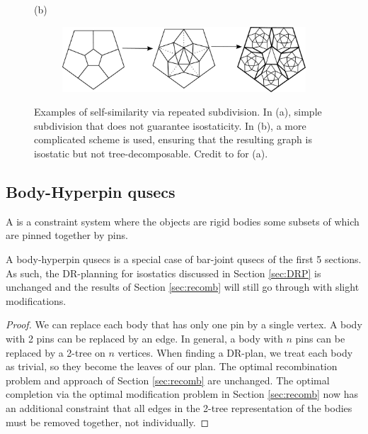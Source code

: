 \begin{figure}
    (b)
    \begin{subfigure}{0.8\linewidth}
        \includegraphics[width=\linewidth]{img/pentawesome}
    \end{subfigure}
    \caption{Examples of self-similarity via repeated subdivision. In (a),
    simple subdivision that does not guarantee isostaticity. In (b), a more
complicated scheme is used, ensuring that the resulting graph is isostatic
but not  tree-decomposable. Credit to \cite{subdivision_paper} for (a).}
    \label{fig:subdivision}
\end{figure}

\subsection{Body-Hyperpin qusecs}


\begin{definition}
    A  is a constraint system where the objects are rigid bodies some subsets of which are pinned together by pins.
\end{definition}

\begin{remark}
\label{rem:bodypin_is_barjoint}
    A body-hyperpin qusecs is a special case of bar-joint qusecs of the
    first 5 sections. As such, the DR-planning for isostatics discussed in Section
    \ref{sec:DRP} is unchanged and the results of Section \ref{sec:recomb} will still go through with slight modifications.
\end{remark}

\begin{proof}
    We can replace each body that has only one pin by a single vertex. A
    body with 2 pins can be replaced by an edge. In general, a body with $n$
    pins can be replaced by a 2-tree on $n$ vertices. When finding a
    DR-plan, we treat each body as trivial, so they become the leaves of our
    plan. The optimal recombination problem and approach of Section
    \ref{sec:recomb} are unchanged. The optimal completion via the optimal modification problem in
Section \ref{sec:recomb} now has an additional constraint that all edges in the 2-tree representation of the bodies must be removed together, not individually.
\end{proof}

